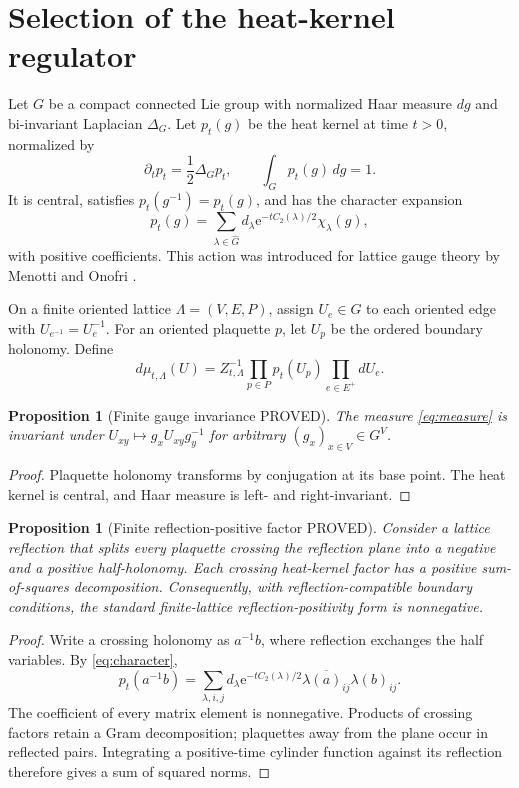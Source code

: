 \documentclass[11pt]{article}
\newcommand{\Pstatus}{\textcolor{proved}{\textsf{PROVED}}}
\newcommand{\e}{\mathrm e}
\newtheorem{proposition}[definition]{Proposition}
\theoremstyle{remark}
\begin{document}
\section{Selection of the heat-kernel regulator}

Let $G$ be a compact connected Lie group with normalized Haar measure $dg$ and
bi-invariant Laplacian $\Delta_G$.  Let $p_t(g)$ be the heat kernel at time
$t>0$, normalized by
\[
 \partial_t p_t=\frac12\Delta_Gp_t,
 \qquad \int_Gp_t(g)\,dg=1.
\]
It is central, satisfies $p_t(g^{-1})=p_t(g)$, and has the character expansion
\begin{equation}\label{eq:character}
 p_t(g)=\sum_{\lambda\in\widehat G}
 d_\lambda\e^{-tC_2(\lambda)/2}\chi_\lambda(g),
\end{equation}
with positive coefficients.  This action was introduced for lattice gauge
theory by Menotti and Onofri \cite{MenottiOnofri}.

On a finite oriented lattice $\Lambda=(V,E,P)$, assign $U_e\in G$ to each
oriented edge with $U_{e^{-1}}=U_e^{-1}$.  For an oriented plaquette $p$, let
$U_p$ be the ordered boundary holonomy.  Define
\begin{equation}\label{eq:measure}
 d\mu_{t,\Lambda}(U)
 =Z_{t,\Lambda}^{-1}\prod_{p\in P}p_t(U_p)
   \prod_{e\in E^+}dU_e.
\end{equation}

\begin{proposition}[Finite gauge invariance \Pstatus]
The measure \eqref{eq:measure} is invariant under
$U_{xy}\mapsto g_xU_{xy}g_y^{-1}$ for arbitrary $(g_x)_{x\in V}\in G^V$.
\end{proposition}

\begin{proof}
Plaquette holonomy transforms by conjugation at its base point.  The heat
kernel is central, and Haar measure is left- and right-invariant.
\end{proof}

\begin{proposition}[Finite reflection-positive factor \Pstatus]\label{prop:rp}
Consider a lattice reflection that splits every plaquette crossing the
reflection plane into a negative and a positive half-holonomy.  Each crossing
heat-kernel factor has a positive sum-of-squares decomposition.  Consequently,
with reflection-compatible boundary conditions, the standard finite-lattice
reflection-positivity form is nonnegative.
\end{proposition}

\begin{proof}
Write a crossing holonomy as $a^{-1}b$, where reflection exchanges the half
variables.  By \eqref{eq:character},
\[
 p_t(a^{-1}b)=\sum_{\lambda,i,j}
 d_\lambda\e^{-tC_2(\lambda)/2}
 \overline{\lambda(a)_{ij}}\lambda(b)_{ij}.
\]
The coefficient of every matrix element is nonnegative.  Products of crossing
factors retain a Gram decomposition; plaquettes away from the plane occur in
reflected pairs.  Integrating a positive-time cylinder function against its
reflection therefore gives a sum of squared norms.
\end{proof}
\end{document}
